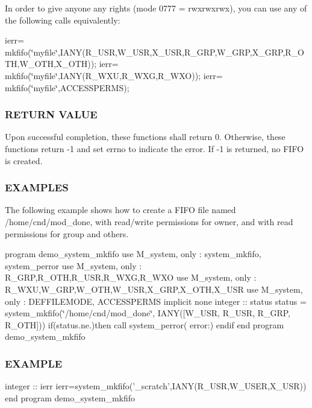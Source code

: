 In order to give anyone any rights (mode 0777 = rwxrwxrwx), you can use any of the following calls equivalently\+:

ierr= mkfifo(\char`\"{}myfile\char`\"{},I\+A\+N\+Y(\+R\+\_\+\+U\+S\+R,\+W\+\_\+\+U\+S\+R,\+X\+\_\+\+U\+S\+R,\+R\+\_\+\+G\+R\+P,\+W\+\_\+\+G\+R\+P,\+X\+\_\+\+G\+R\+P,\+R\+\_\+\+O\+T\+H,\+W\+\_\+\+O\+T\+H,\+X\+\_\+\+O\+T\+H)); ierr= mkfifo(\char`\"{}myfile\char`\"{},I\+A\+N\+Y(\+R\+\_\+\+W\+X\+U,\+R\+\_\+\+W\+X\+G,\+R\+\_\+\+W\+X\+O)); ierr= mkfifo(\char`\"{}myfile\char`\"{},A\+C\+C\+E\+S\+S\+P\+E\+R\+MS); \subsubsection*{R\+E\+T\+U\+RN V\+A\+L\+UE}

Upon successful completion, these functions shall return 0. Otherwise, these functions return -\/1 and set errno to indicate the error. If -\/1 is returned, no F\+I\+FO is created.

\subsubsection*{E\+X\+A\+M\+P\+L\+ES}

The following example shows how to create a F\+I\+FO file named /home/cnd/mod\+\_\+done, with read/write permissions for owner, and with read permissions for group and others.

program demo\+\_\+system\+\_\+mkfifo use M\+\_\+system, only \+: system\+\_\+mkfifo, system\+\_\+perror use M\+\_\+system, only \+: R\+\_\+\+G\+RP,R\+\_\+\+O\+TH,R\+\_\+\+U\+SR,R\+\_\+\+W\+XG,R\+\_\+\+W\+XO use M\+\_\+system, only \+: R\+\_\+\+W\+XU,W\+\_\+\+G\+RP,W\+\_\+\+O\+TH,W\+\_\+\+U\+SR,X\+\_\+\+G\+RP,X\+\_\+\+O\+TH,X\+\_\+\+U\+SR use M\+\_\+system, only \+: D\+E\+F\+F\+I\+L\+E\+M\+O\+DE, A\+C\+C\+E\+S\+S\+P\+E\+R\+MS implicit none integer \+:\+: status status = system\+\_\+mkfifo(\char`\"{}/home/cnd/mod\+\_\+done\char`\"{}, I\+A\+N\+Y(\mbox{[}\+W\+\_\+\+U\+S\+R, R\+\_\+\+U\+S\+R, R\+\_\+\+G\+R\+P, R\+\_\+\+O\+T\+H\mbox{]})) if(status.\+ne.)then call system\+\_\+perror( error\+:\textquotesingle{}) endif end program demo\+\_\+system\+\_\+mkfifo

\subsubsection*{E\+X\+A\+M\+P\+LE}

\begin{DoxyVerb}integer :: ierr
ierr=system_mkfifo('_scratch',IANY(R_USR,W_USER,X_USR))
end program demo_system_mkfifo \end{DoxyVerb}
 

